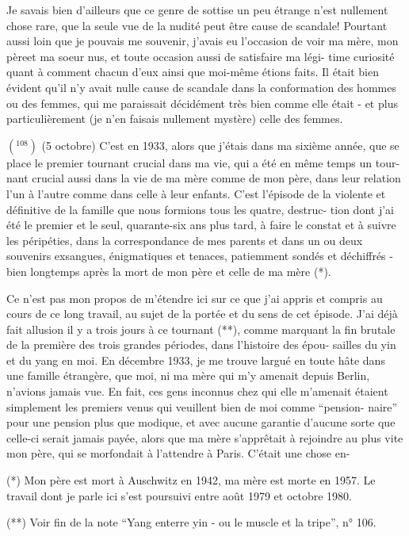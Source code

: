 Je savais bien d'ailleurs que ce genre de sottise un peu étrange n'est
nullement chose rare, que la seule vue de la nudité peut être cause de scandale!
Pourtant aussi loin que je pouvais me souvenir, j'avais eu l'occasion de voir ma
mère, mon père\quad et ma soeur nus, et toute occasion aussi de satisfaire ma légi-\newline
time curiosité quant à comment chacun d'eux ainsi que moi-même étions faits. Il
était bien évident qu'il n'y avait nulle cause de scandale dans la conformation
des hommes ou des femmes, qui me paraissait décidément très bien comme elle
était - et plus particulièrement (je n'en faisais nullement mystère) celle des
femmes.

\(({}^{108})\) (5 octobre) C'est en 1933, alors que j'étais dans ma sixième année, que se
place le premier tournant crucial dans ma vie, qui a été en même temps un tour-\newline
nant crucial aussi dans la vie de ma mère comme de mon père, dans leur relation
l'un à l'autre comme dans celle à leur enfants. C'est l'épisode de la 
violente et définitive de la famille que nous formions tous les quatre, destruc-\newline
tion dont j'ai été le premier et le seul, quarante-six ans plus tard, à faire le
constat et à suivre les péripéties, dans la correspondance de mes parents et
dans un ou deux souvenirs exsangues, énigmatiques et tenaces, patiemment sondés
et déchiffrés - bien longtemps après la mort de mon père et celle de ma mère (*).

Ce n'est pas mon propos de m'étendre ici sur ce que j'ai appris et compris
au cours de ce long travail, au sujet de la portée et du sens de cet épisode.
J'ai déjà fait allusion il y a trois jours à ce tournant (**), comme marquant la
fin brutale de la première des trois grandes périodes, dans l'histoire des épou-\newline
sailles du yin et du yang en moi. En décembre 1933, je me trouve largué en toute
hâte dans une famille étrangère, que moi, ni ma mère qui m'y amenait depuis
Berlin, n'avions jamais vue. En fait, ces gens inconnus chez qui elle m'amenait
étaient simplement les premiers venus qui veuillent bien de moi comme ``pension-\newline
naire'' pour une pension plus que modique, et avec aucune garantie d'aucune sorte
que celle-ci serait jamais payée, alors que ma mère s'apprêtait à rejoindre au
plus vite mon père, qui se morfondait à l'attendre à Paris. C'était une chose en-

(*) Mon père est mort à Auschwitz en 1942, ma mère est morte en 1957. Le travail
dont je parle ici s'est poursuivi entre août 1979 et octobre 1980.

(**) Voir fin de la note ``Yang enterre yin - ou le muscle et la tripe'', n° 106.

